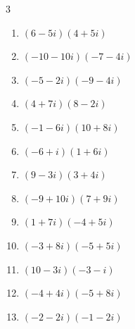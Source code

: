 \begin{multicols}{3}
\begin{enumerate}
  \item $\displaystyle (6-5i)(4+5i)$

        \phantom{$\displaystyle =49+10i$}

  \item $\displaystyle (-10-10i)(-7-4i)$

        \phantom{$\displaystyle =30+110i$}

  \item $\displaystyle (-5-2i)(-9-4i)$

        \phantom{$\displaystyle =37+38i$}

  \item $\displaystyle (4+7i)(8-2i)$

        \phantom{$\displaystyle =46+48i$}

  \item $\displaystyle (-1-6i)(10+8i)$

        \phantom{$\displaystyle =38-68i$}

  \item $\displaystyle (-6+i)(1+6i)$

        \phantom{$\displaystyle =-12-35i$}

  \item $\displaystyle (9-3i)(3+4i)$

        \phantom{$\displaystyle =39+27i$}

  \item $\displaystyle (-9+10i)(7+9i)$

        \phantom{$\displaystyle =-153-11i$}

  \item $\displaystyle (1+7i)(-4+5i)$

        \phantom{$\displaystyle =-39-23i$}

  \item $\displaystyle (-3+8i)(-5+5i)$

        \phantom{$\displaystyle =-25-55i$}

  \item $\displaystyle (10-3i)(-3-i)$

        \phantom{$\displaystyle =-33-i$}

  \item $\displaystyle (-4+4i)(-5+8i)$

        \phantom{$\displaystyle =-12-52i$}

\columnbreak %

  \item $\displaystyle (-2-2i)(-1-2i)$


\end{enumerate}
\end{multicols}
